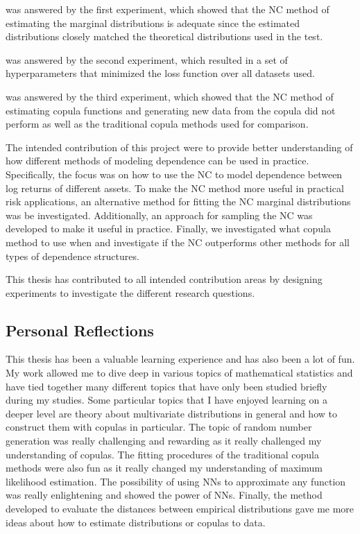 \RQone was answered by the first experiment, which showed that the \gls{NC} method of estimating the marginal distributions is adequate since the estimated distributions closely matched the theoretical distributions used in the test. 

\RQtwo was answered by the second experiment, which resulted in a set of hyperparameters that minimized the loss function over all datasets used. 

\RQthree was answered by the third experiment, which showed that the \gls{NC} method of estimating copula functions and generating new data from the copula did not perform as well as the traditional copula methods used for comparison.   


The intended contribution of this project were to provide better understanding of how different methods of modeling dependence can be used in practice. Specifically, the focus was on how to use the \gls{NC} to model dependence between log returns of different assets. To make the \gls{NC} method more useful in practical risk applications, an alternative method for fitting the \gls{NC} marginal distributions was be investigated. Additionally, an approach for sampling the \gls{NC} was developed to make it useful in practice. Finally, we investigated what copula method to use when and investigate if the \gls{NC} outperforms other methods for all types of dependence structures. 

This thesis has contributed to all intended contribution areas by designing experiments to investigate the different research questions. 

\subsection{Personal Reflections}
This thesis has been a valuable learning experience and has also been a lot of fun. My work allowed me to dive deep in various topics of mathematical statistics and have tied together many different topics that have only been studied briefly during my studies. Some particular topics that I have enjoyed learning on a deeper level are theory about multivariate distributions in general and how to construct them with copulas in particular. The topic of random number generation was really challenging and rewarding as it really challenged my understanding of copulas. The fitting procedures of the traditional copula methods were also fun as it really changed my understanding of maximum likelihood estimation. The possibility of using \gls{NN}s to approximate any function was really enlightening and showed the power of \gls{NN}s. Finally, the method developed to evaluate the distances between empirical distributions gave me more ideas about how to estimate distributions or copulas to data.  

